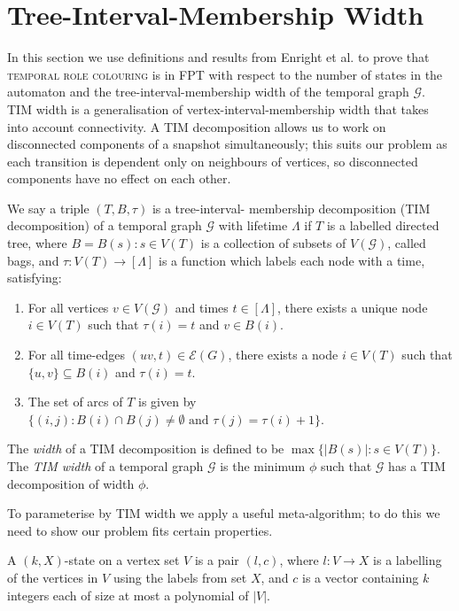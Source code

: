 \documentclass[runningheads]{llncs}
\begin{document}
\section {Tree-Interval-Membership Width}
In this section we use definitions and results from Enright et al. \cite{enright2025families} to prove that \textsc{temporal role colouring} is in FPT with respect to the number of states in the automaton and the tree-interval-membership width of the temporal graph $\mathcal{G}$. 
TIM width is a generalisation of vertex-interval-membership width that takes into account connectivity. A TIM decomposition allows us to work on disconnected components of a snapshot simultaneously; this suits our problem as each transition is dependent only on neighbours of vertices, so disconnected components have no effect on each other. 

\begin{definition}
We say a triple $(T,B,\tau)$ is a tree-interval-
membership decomposition (TIM decomposition) of a temporal graph $\mathcal{G}$ with lifetime $\Lambda$ if $T$ is a labelled directed tree, where $B={B(s):s \in V(T)}$ is a collection of subsets of $V(\mathcal{G})$, called bags, and $\tau :V(T) \rightarrow [\Lambda]$ is a function which labels each node with a time, satisfying:
\begin{enumerate}
    \item For all vertices $v\in V(\mathcal{G})$ and times $t\in [\Lambda]$, there exists a unique node $i\in V(T)$ such that $\tau (i)=t$ and $v \in B(i)$.
    \item For all time-edges $(uv,t) \in \mathcal{E}(G)$, there exists a node $i \in V(T)$ such that $\{u,v\}\subseteq B(i)$ and $\tau(i)=t$. 
    \item The set of arcs of $T$ is given by $\{(i,j) : B(i)\cap B(j) \neq  \emptyset \text{ and } \tau (j)= \tau (i)+1\}$.
\end{enumerate}
The \emph{width} of a TIM decomposition is defined to be $ \max \{ |B(s)| :s \in V(T)\}$. The \emph{TIM width} of a temporal graph $\mathcal{G}$ is the minimum $\phi$ such that $\mathcal{G}$ has a TIM decomposition of width $\phi$.
\end{definition}

To parameterise by TIM width we apply a useful meta-algorithm; to do this we need to show our problem fits certain properties.
\begin{definition}[(k,X)-State]
A $(k,X)$-state on a vertex set $V$ is a pair $(l,c)$, where
$l : V \rightarrow X$ is a labelling of the vertices in $V$ using the labels from set $X$, and $c$ is a vector containing $k$ integers each of size at most a polynomial of $|V|$.
\end{definition}
\end{document}

